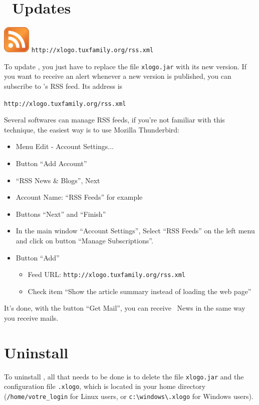 \section{\xlogo\ Updates}
\begin{center}
\includegraphics{pics/rss.png} \hspace{1cm} \texttt{http://xlogo.tuxfamily.org/rss.xml}
\end{center}
To update \xlogo, you just have to replace the file \texttt{xlogo.jar} with its new version. 
If you want to receive an alert whenever a new version is published, you can subscribe to \xlogo's RSS feed. Its address is 
\begin{center}
 \texttt{http://xlogo.tuxfamily.org/rss.xml}
\end{center}
Several softwares can manage RSS feeds, if you're not familiar with this technique, the easiest way is to use Mozilla Thunderbird:
\begin{itemize}
 \item Menu Edit - Account Settings...
 \item Button ``Add Account''
 \item ``RSS News \& Blogs'', Next
 \item Account Name: ``RSS Feeds'' for example
 \item Buttons ``Next'' and ``Finish''
 \item In the main window ``Account Settings'', Select ``RSS Feeds'' on the left menu and click on button ``Manage Subscriptions''.
 \item Button ``Add''
	\begin{itemize}
 	\item Feed URL: \texttt{http://xlogo.tuxfamily.org/rss.xml}
	\item  Check item  ``Show the article summary instead of loading the web page''
	\end{itemize}
\end{itemize}
\vspace*{0.2cm}
It's done, with the button ``Get Mail'', you can receive \xlogo\ News in the same way you receive mails.
\section{Uninstall}\label{fichier_perso}
To uninstall \xlogo, all that needs to be done is to delete the file \texttt{xlogo.jar} and the configuration file \texttt{.xlogo}\label{file_perso}, which is located in your home directory (\texttt{/home/votre\_login} for Linux users, or \texttt{c:\textbackslash windows\textbackslash.xlogo} for Windows users).
